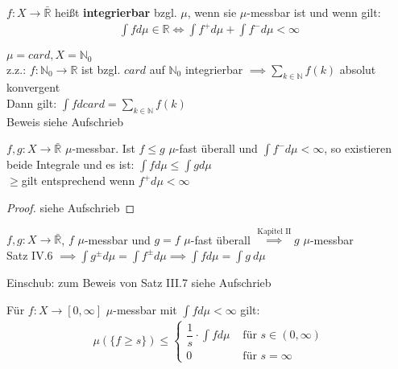   \begin{definition}
    $f:X \to \bar{\mathbb{R}}$ heißt \textbf{integrierbar} bzgl. $\mu$, wenn sie $\mu$-messbar ist und wenn gilt:
    \begin{align*}
      \int f d\mu \in \mathbb{R} \Leftrightarrow \int f^+ d\mu + \int f^- d\mu < \infty
    \end{align*}
  \end{definition}

  \begin{example}
    $\mu = card, X = \mathbb{N}_0$\\
    z.z.: $f: \mathbb{N}_0 \to \mathbb{R}$ ist bzgl. $card$ auf $\mathbb{N}_0$ integrierbar $\implies \sum\limits_{k \in \mathbb{N}} f(k)$ absolut konvergent\\
    Dann gilt: $\int f d card = \sum\limits_{k \in \mathbb{N}} f(k)$\\
    Beweis siehe Aufschrieb
  \end{example}

  \begin{theorem}
    $f,g:X \to \bar{\mathbb{R}}$ $\mu$-messbar. Ist $f \leq g$ $\mu$-fast überall und $\int f^- d\mu < \infty$, so existieren beide Integrale und es ist: $\int f d\mu \leq \int g d\mu$\\
    \glqq$\geq$\grqq gilt entsprechend wenn $f^+ d\mu < \infty$
  \end{theorem}

  \begin{proof}
    siehe Aufschrieb
  \end{proof}

  \begin{remark}
    $f,g: X \to \bar{\mathbb{R}}$, $f$ $\mu$-messbar und $g = f$ $\mu$-fast überall $\stackrel{\text{Kapitel II}}{\implies} g$ $\mu$-messbar\\
    Satz IV.6 $\implies \int g^{\pm} d\mu = \int f^{\pm} d\mu \implies \int f d\mu = \int g \ d\mu$
  \end{remark}


  \begin{remark}
    Einschub: zum Beweis von Satz III.7
    siehe Aufschrieb
  \end{remark}

  \begin{lemma}
    Für $f:X \to [0, \infty]$ $\mu$-messbar mit $\int f d\mu < \infty$ gilt:
    \begin{align*}
      \mu(\{f\geq s\}) \leq \begin{cases}
        \dfrac{1}{s} \cdot \int f d\mu & \text{ für } s \in (0, \infty)\\
        0 & \text{ für } s = \infty
      \end{cases}
    \end{align*}
  \end{lemma}

